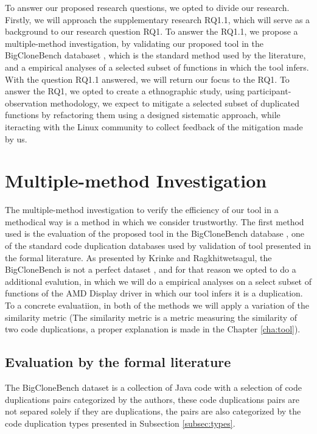\en

To answer our proposed research questions, we opted to divide our research. Firstly, we will approach the supplementary research 
RQ1.1, which will serve as a background to our research question RQ1. To answer the RQ1.1, we propose a multiple-method investigation,
by validating our proposed tool in the BigCloneBench databaset \citep{bigclonebench}, which is the standard method used by the
literature, and a empirical analyses of a selected subset of functions in which the tool infers.
With the question RQ1.1 answered, we will return our focus to the RQ1. To answer the RQ1, we opted to create a ethnographic study, 
using participant-observation methodology, we expect to mitigate a selected subset of duplicated functions by refactoring them using
a designed sistematic approach, while iteracting with the Linux community to collect feedback of the mitigation made by us.

\section{Multiple-method Investigation}

The multiple-method investigation to verify the efficiency of our tool in a methodical way is a method in which we consider 
trustworthy.
The first method used is the evaluation of the proposed tool in the BigCloneBench database \citep{bigclonebench}, one of the 
standard code duplication databases used by validation of tool presented in the formal literature. 
As presented by Krinke and Ragkhitwetsagul, the BigCloneBench is not a perfect dataset \citep{bigfail}, and for that reason we opted to do
a additional evalution, in which we will do a empirical analyses on a select subset of functions of the AMD Display driver in which
our tool infers it is a duplication. To a concrete evaluatiion, in both of the methods we will apply a  variation of the similarity 
metric (The similarity metric is a metric measuring the similarity of two code duplications, a proper explanation is made 
in the Chapter \ref{cha:tool}).

\subsection{Evaluation by the formal literature}

The BigCloneBench dataset \citep{bigclonebench} is a collection of Java code with a selection of code duplications pairs categorized by the authors, these
code duplications pairs are not separed solely if they are duplications, the pairs are also categorized by the code duplication
types presented in Subsection \ref{subsec:types}. 

